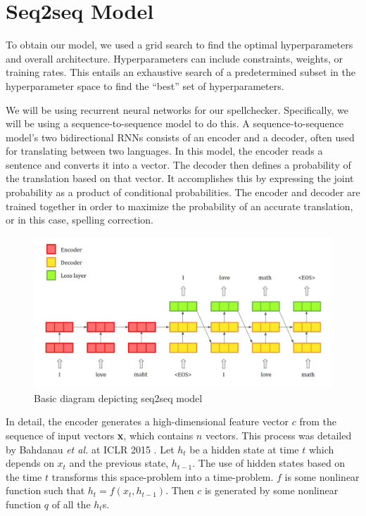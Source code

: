 \documentclass[11pt,a4paper]{scrartcl}
\theoremstyle{definition}
\begin{document}
\section{Seq2seq Model}

To obtain our model, we used a grid search to find the optimal hyperparameters and overall architecture. Hyperparameters can include constraints, weights, or training rates. This entails an exhaustive search of a predetermined subset in the hyperparameter space to find the “best” set of hyperparameters.\newline

We will be using recurrent neural networks for our spellchecker. Specifically, we will be using a sequence-to-sequence model to do this. A sequence-to-sequence model’s two bidirectional RNNs consists of an encoder and a decoder, often used for translating between two languages. 
In this model, the encoder reads a sentence and converts it into a vector. The decoder then defines a probability of the translation based on that vector. It accomplishes this by expressing the joint probability as a product of conditional probabilities. The encoder and decoder are trained together in order to maximize the probability of an accurate translation, or in this case, spelling correction.\newline

\begin{figure}[!ht]
\centering
\includegraphics[scale=0.4]{seq2seq_diagram.JPG}
\caption{Basic diagram depicting seq2seq model}
\label{figR1}
\end{figure}
\FloatBarrier

In detail, the encoder generates a high-dimensional feature vector $c$ from the sequence of input vectors \textbf{x}, which contains $n$ vectors. This process was detailed by Bahdanau \emph{et al.} at ICLR 2015 \cite{Bahdanau}. Let $h_t$ be a hidden state at time $t$ which depends on $x_t$ and the previous state, $h_{t-1}$. The use of hidden states based on the time $t$ transforms this space-problem into a time-problem. $f$ is some nonlinear function such that $h_t = f(x_t, h_{t-1})$. Then $c$ is generated by some nonlinear function $q$ of all the $h_t$s. \newline
\end{document}
